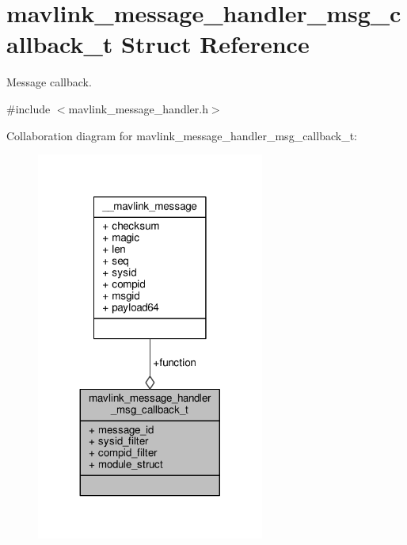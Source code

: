 \hypertarget{structmavlink__message__handler__msg__callback__t}{\section{mavlink\+\_\+message\+\_\+handler\+\_\+msg\+\_\+callback\+\_\+t Struct Reference}
\label{structmavlink__message__handler__msg__callback__t}
}


Message callback.  




{\ttfamily \#include $<$mavlink\+\_\+message\+\_\+handler.\+h$>$}



Collaboration diagram for mavlink\+\_\+message\+\_\+handler\+\_\+msg\+\_\+callback\+\_\+t\+:
\nopagebreak
\begin{figure}[H]
\begin{center}
\leavevmode
\includegraphics[width=212pt]{structmavlink__message__handler__msg__callback__t__coll__graph}
\end{center}
\end{figure}
